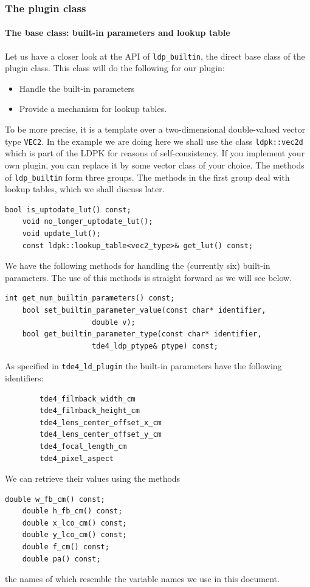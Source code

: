 \documentclass[10pt,a4paper]{article}
\begin{document}
\subsubsection{The plugin class}
\paragraph{The base class: built-in parameters and lookup table}
Let us have a closer look at the API of {\tt ldp\_builtin}, the direct base class of the plugin class.
This class will do the following for our plugin:
\begin{itemize}
\item Handle the built-in parameters
\item Provide a mechanism for lookup tables.
\end{itemize}
To be more precise, it is a template over a two-dimensional double-valued vector type {\tt VEC2}.
In the example we are doing here we shall use the class  {\tt ldpk::vec2d} which is part of the LDPK
for reasons of self-consistency. If you implement your own plugin, you can replace it by some vector
class of your choice. The methods of {\tt ldp\_builtin} form three groups.
The methods in the first group deal with lookup tables, which we shall discuss later.
\begin{lstlisting}[language=mycpp,tabsize=8]
	bool is_uptodate_lut() const;
	void no_longer_uptodate_lut();
	void update_lut();
	const ldpk::lookup_table<vec2_type>& get_lut() const;
\end{lstlisting}
We have the following methods for handling the (currently six) built-in parameters.
The use of this methods is straight forward as we will see below.
\begin{lstlisting}[language=mycpp,tabsize=8]
	int get_num_builtin_parameters() const;
	bool set_builtin_parameter_value(const char* identifier,
					double v);
	bool get_builtin_parameter_type(const char* identifier,
					tde4_ldp_ptype& ptype) const;
\end{lstlisting}
As specified in {\tt tde4\_ld\_plugin} the built-in parameters have the
following identifiers:
\begin{verbatim}
        tde4_filmback_width_cm
        tde4_filmback_height_cm
        tde4_lens_center_offset_x_cm
        tde4_lens_center_offset_y_cm
        tde4_focal_length_cm
        tde4_pixel_aspect
\end{verbatim}
We can retrieve their values using the methods
\begin{lstlisting}[language=mycpp,tabsize=8]
	double w_fb_cm() const;
	double h_fb_cm() const;
	double x_lco_cm() const;
	double y_lco_cm() const;
	double f_cm() const;
	double pa() const;
\end{lstlisting}
the names of which resemble the variable names we use in this document.
%
%
%
\end{document}
